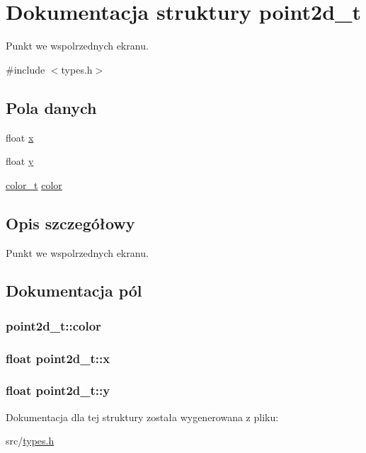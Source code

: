 \hypertarget{structpoint2d__t}{\section{Dokumentacja struktury point2d\-\_\-t}
\label{structpoint2d__t}
}


Punkt we wspolrzednych ekranu.  




{\ttfamily \#include $<$types.\-h$>$}

\subsection*{Pola danych}
\begin{DoxyCompactItemize}
\item 
float \hyperlink{structpoint2d__t_a6b52fbe1db413e6273a6e33c23158c2d}{x}
\item 
float \hyperlink{structpoint2d__t_acd589ab17f5cb77d50230c6246a1c671}{y}
\item 
\hyperlink{types_8h_af00bd69e44901f206becdb8e7cf0ff27}{color\-\_\-t} \hyperlink{structpoint2d__t_adab609377d70a908d71cc3475eb4c88f}{color}
\end{DoxyCompactItemize}


\subsection{Opis szczegółowy}
Punkt we wspolrzednych ekranu. 

\subsection{Dokumentacja pól}
\hypertarget{structpoint2d__t_adab609377d70a908d71cc3475eb4c88f}{
\subsubsection[{color}]{ point2d\-\_\-t\-::color}}\label{structpoint2d__t_adab609377d70a908d71cc3475eb4c88f}
\hypertarget{structpoint2d__t_a6b52fbe1db413e6273a6e33c23158c2d}{
\subsubsection[{x}]{\setlength{\rightskip}{0pt plus 5cm}float point2d\-\_\-t\-::x}}\label{structpoint2d__t_a6b52fbe1db413e6273a6e33c23158c2d}
\hypertarget{structpoint2d__t_acd589ab17f5cb77d50230c6246a1c671}{
\subsubsection[{y}]{\setlength{\rightskip}{0pt plus 5cm}float point2d\-\_\-t\-::y}}\label{structpoint2d__t_acd589ab17f5cb77d50230c6246a1c671}


Dokumentacja dla tej struktury została wygenerowana z pliku\-:\begin{DoxyCompactItemize}
\item 
src/\hyperlink{types_8h}{types.\-h}\end{DoxyCompactItemize}
